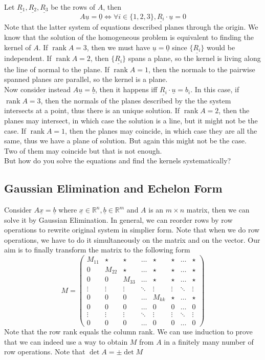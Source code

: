Let $\underline{R_1},\underline{R_2},\underline{R_3}$ be the rows of $A$, then
$$A\underline{u}=\underline{0}\iff \forall i\in\{1,2,3\},\underline{R_i}\cdot\underline{u}=0$$
Note that the latter system of equations described planes through the origin.
We know that the solution of the homogeneous problem is equivalent to finding the kernel of $A$.
If $\operatorname{rank}A=3$, then we must have $\underline{u}=\underline{0}$ since $\{\underline{R_i}\}$ would be independent.
If $\operatorname{rank}A=2$, then $\{\underline{R_i}\}$ spans a plane, so the kernel is living along the line of normal to the plane.
If $\operatorname{rank}A=1$, then the normals to the pairwise spanned planes are parallel, so the kernel is a plane.\\
Now consider instead $A\underline{u}=\underline{b}$, then it happens iff $\underline{R_i}\cdot \underline{u}=b_i$.
In this case, if $\operatorname{rank}A=3$, then the normals of the planes described by the the system intersects at a point, thus there is an unique solution.
If $\operatorname{rank}A=2$, then the planes may intersect, in which case the solution is a line, but it might not be the case.
If $\operatorname{rank}A=1$, then the planes may coincide, in which case they are all the same, thus we have a plane of solution.
But again this might not be the case.
Two of them may coincide but that is not enough.\\
But how do you solve the equations and find the kernels systematically?
\subsection{Gaussian Elimination and Echelon Form}
Consider $A\underline{x}=\underline{b}$ where $\underline{x}\in\mathbb R^n,\underline{b}\in\mathbb R^m$ and $A$ is an $m\times n$ matrix, then we can solve it by Gaussian Elimination.
In general, we can reorder rows by row operations to rewrite original system in simplier form.
Note that when we do row operations, we have to do it simultaneously on the matrix and on the vector.
Our aim is to finally transform the matrix to the following form
$$M=\begin{pmatrix}
    M_{11}&\star&\star&\dots&\star&\star&\dots&\star\\
    0&M_{22}&\star&\dots&\star&\star&\dots&\star\\
    0&0&M_{33}&\dots&\star&\star&\dots&\star\\
    \vdots&\vdots&\vdots&\ddots&\vdots&\vdots&\ddots&\vdots\\
    0&0&0&\dots&M_{kk}&\star&\dots&\star\\
    0&0&0&\dots&0&0&\dots&0\\
    \vdots&\vdots&\vdots&\ddots&\vdots&\vdots&\ddots&\vdots\\
    0&0&0&\dots&0&0&\dots&0
\end{pmatrix}$$
Note that the row rank equals the column rank.
We can use induction to prove that we can indeed use a way to obtain $M$ from $A$ in a finitely many number of row operations.
Note that $\det A=\pm\det M$